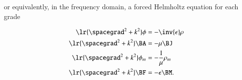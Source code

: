 or equivalently, in the frequency domain, a forced Helmholtz equation for each grade

\begin{dmath}\label{eqn:potentialSection_LorenzGauge:1780}
\begin{aligned}
\lr{ \spacegrad^2 + k^2 } \phi &= - \inv{\epsilon} \rho \\
\lr{ \spacegrad^2 + k^2 } \BA &= - \mu \BJ \\
\lr{ \spacegrad^2 + k^2 } \phi_m &= - \frac{1}{\mu} \rho_m \\
\lr{ \spacegrad^2 + k^2 } \BF &= - \epsilon \BM.
\end{aligned}
\end{dmath}

